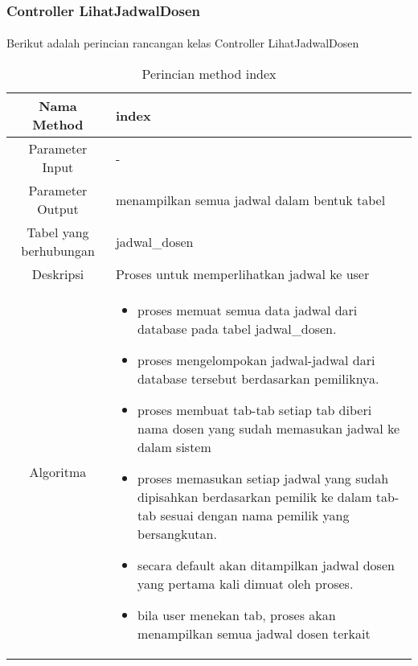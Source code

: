 \subsubsection{Controller LihatJadwalDosen}
\paragraph{} Berikut adalah perincian rancangan kelas Controller LihatJadwalDosen
\begin{center}
\begin{table}[H]
\caption{Perincian method index}
\begin{tabular}{|c|p{11cm}|}
\hline
Nama Method 	& 	index 	\\
\hline
Parameter Input & - \\
\hline
Parameter Output & menampilkan semua jadwal dalam bentuk tabel \\
\hline
Tabel yang berhubungan & jadwal\_dosen \\
\hline
Deskripsi	& Proses untuk memperlihatkan jadwal ke user \\
\hline
Algoritma	& \begin{itemize}
				\item proses memuat semua data jadwal dari database pada tabel jadwal\_dosen.
				\item proses mengelompokan jadwal-jadwal dari database tersebut berdasarkan pemiliknya.
				\item proses membuat tab-tab setiap tab diberi nama dosen yang sudah memasukan jadwal ke dalam sistem
				\item proses memasukan setiap jadwal yang sudah dipisahkan berdasarkan pemilik ke dalam tab-tab sesuai dengan nama pemilik yang bersangkutan.
				\item secara default akan ditampilkan jadwal dosen yang pertama kali dimuat oleh proses.
				\item bila user menekan tab, proses akan menampilkan semua jadwal dosen terkait
				\end{itemize} \\
\hline
\end{tabular}
\end{table}
\end{center}


